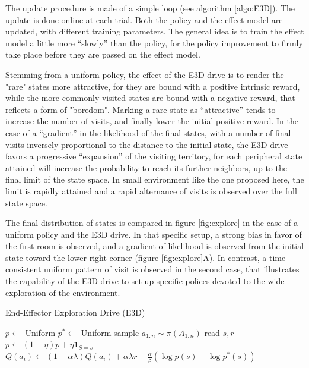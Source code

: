 \documentclass[runningheads]{llncs}
\begin{document}
The update procedure is made of a simple loop (see algorithm \ref{algo:E3D}). The update is done online at each trial. Both the policy and the effect model are updated, with different training parameters. The general idea is to train the effect model a little more ``slowly'' than the policy, for the policy improvement to firmly take place before they are passed on the effect model. 

Stemming from a uniform policy, the effect of the E3D drive is to render the "rare" states more
attractive, for they are bound with a positive intrinsic reward, while the more commonly visited 
 states are bound with a negative reward, that reflects a form of "boredom". Marking a rare state as ``attractive'' tends to increase the number of visits, and finally lower the initial positive reward. In the case of a ``gradient'' in the likelihood of the final states, with a number of final visits inversely proportional to the distance to the initial state, the E3D drive favors a progressive ``expansion'' of the visiting territory, for each peripheral state attained will increase the probability to reach its further neighbors, up to the final limit of the state space. In small environment like the one proposed here, the limit is rapidly attained and a rapid alternance of visits is observed over the full state space. 

The final distribution of states is compared in figure \ref{fig:explore} in the case of a uniform policy and the E3D drive. In that specific setup, a strong bias in favor of the first room is observed, and a gradient of likelihood is observed from the initial state toward the lower right corner (figure \ref{fig:explore}A). In contrast, a time consistent uniform pattern of visit is observed in the second case, that illustrates the capability of the E3D drive to set up specific polices devoted to the wide exploration of the environment.     

\begin{algorithm}[t]
	\caption{End-Effector Exploration Drive (E3D)}\label{algo:E3D}
	\begin{algorithmic}
		\REQUIRE{$\alpha$, $\beta$, $\lambda$, $\eta$}
		\STATE $p \leftarrow$ Uniform
		\STATE $p^* \leftarrow$ Uniform
			\STATE sample $a_{1:n} \sim \pi(A_{1:n})$ 
			\STATE read $s,r$
			\STATE $p \leftarrow (1-\eta) p + \eta \mathbf{1}_{S=s} $ 
			    \STATE $Q(a_i) \leftarrow (1-\alpha\lambda) Q(a_i) + \alpha\lambda r - \frac{\alpha}{\beta} (\log p(s)-\log p^*(s))$ 
			\ENDFOR
		\ENDWHILE
	\end{algorithmic}
\end{algorithm}
\end{document}
